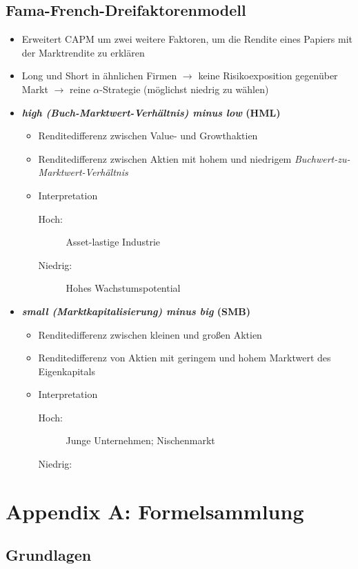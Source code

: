 \subsection{Fama-French-Dreifaktorenmodell}
\begin{itemize}
	\item Erweitert CAPM um zwei weitere Faktoren, um die Rendite eines Papiers mit der Marktrendite zu erklären
	\item Long und Short in ähnlichen Firmen \(\rightarrow\) keine Risikoexposition gegenüber Markt \(\rightarrow\) reine \(\alpha\)-Strategie (möglichst niedrig zu wählen)
	\item \textbf{\textit{high (Buch-Marktwert-Verhältnis) minus low} (HML)}
	\begin{itemize}
		\item Renditedifferenz zwischen Value- und Growthaktien
		\item Renditedifferenz zwischen Aktien mit hohem und niedrigem \textit{Buchwert-zu-Marktwert-Verhältnis}
		\item Interpretation
		\begin{description}
			\item[Hoch:] Asset-lastige Industrie
			\item[Niedrig:] Hohes Wachstumspotential
		\end{description}
	\end{itemize}
	\item \textbf{\textit{small (Marktkapitalisierung) minus big} (SMB)}
	\begin{itemize}
		\item Renditedifferenz zwischen kleinen und großen Aktien
		\item Renditedifferenz von Aktien mit geringem und hohem Marktwert des Eigenkapitals
		\item Interpretation
		\begin{description}
			\item[Hoch:] Junge Unternehmen; Nischenmarkt
			\item[Niedrig:]
		\end{description}
	\end{itemize}
\end{itemize}
\newpage


\section{Appendix A: Formelsammlung}

\subsection{Grundlagen}

